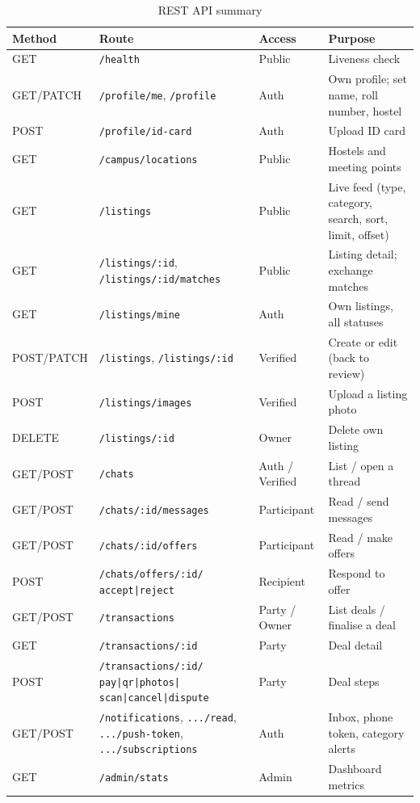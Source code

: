 \documentclass[11pt,a4paper]{scrreprt}
\begin{document}
{\small\begin{longtable}{L{2.3cm} L{5.6cm} L{1.9cm} L{4.5cm}}
\caption{REST API summary}\label{tab:api}\\
\toprule
\textbf{Method} & \textbf{Route} & \textbf{Access} & \textbf{Purpose}\\ \midrule\endhead
GET & \texttt{/health} & Public & Liveness check\\
GET/PATCH & \texttt{/profile/me}, \texttt{/profile} & Auth & Own profile; set name, roll number, hostel\\
POST & \texttt{/profile/id-card} & Auth & Upload ID card\\
GET & \texttt{/campus/locations} & Public & Hostels and meeting points\\
GET & \texttt{/listings} & Public & Live feed (type, category, search, sort, limit, offset)\\
GET & \texttt{/listings/:id}, \texttt{/listings/:id/matches} & Public & Listing detail; exchange matches\\
GET & \texttt{/listings/mine} & Auth & Own listings, all statuses\\
POST/PATCH & \texttt{/listings}, \texttt{/listings/:id} & Verified & Create or edit (back to review)\\
POST & \texttt{/listings/images} & Verified & Upload a listing photo\\
DELETE & \texttt{/listings/:id} & Owner & Delete own listing\\
GET/POST & \texttt{/chats} & Auth / Verified & List / open a thread\\
GET/POST & \texttt{/chats/:id/messages} & Participant & Read / send messages\\
GET/POST & \texttt{/chats/:id/offers} & Participant & Read / make offers\\
POST & \texttt{/chats/offers/:id/} \texttt{accept|reject} & Recipient & Respond to offer\\
GET/POST & \texttt{/transactions} & Party / Owner & List deals / finalise a deal\\
GET & \texttt{/transactions/:id} & Party & Deal detail\\
POST & \texttt{/transactions/:id/} \texttt{pay|qr|photos|} \texttt{scan|cancel|dispute} & Party & Deal steps\\
GET/POST & \texttt{/notifications}, \texttt{.../read}, \texttt{.../push-token}, \texttt{.../subscriptions} & Auth & Inbox, phone token, category alerts\\
GET & \texttt{/admin/stats} & Admin & Dashboard metrics\\

\end{longtable}}
\end{document}

